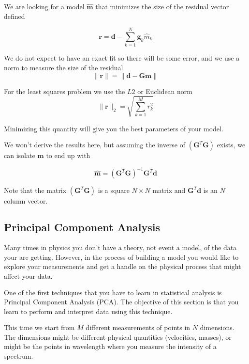 \documentclass{article}
\begin{document}
We are looking for a model $\hat{\mathbf{m}}$ that minimizes the size of the residual vector defined

\begin{equation}
\mathbf{r} = \mathbf{d} -  \sum_{k=1}^{N} \mathbf{g}_k \hat{m}_k
\end{equation}

We do not expect to have an exact fit so there will be some error, and we use a norm to measure the size of the residual
\begin{equation}
\| \mathbf{r} \| = \| \mathbf{d} - \mathbf{Gm} \|
\end{equation}

For the least squares problem we use the $L2$ or Euclidean norm 
\begin{equation}
\| \mathbf{r} \|_2 = \sqrt{\sum_{k=1}^M r^2_k}
\end{equation}

Minimizing this quantity will give you the best parameters of your model.


We won't derive the results here, but assuming the inverse of $(\mathbf{G}^T \mathbf{G})$ exists, we can isolate $\hat{\mathbf{m}}$ to end up with

\begin{equation}
\hat{\mathbf{m}} = {(\mathbf{G}^T \mathbf{G})}^{-1}\mathbf{G}^T \mathbf{d}   
\end{equation}

Note that the matrix ${(\mathbf{G}^T \mathbf{G})}$ is a square $N\times N$ matrix and $\mathbf{G}^T\mathbf{d}$ is an $N$ column vector. 

\subsection{Principal Component Analysis}

Many times in physics you don't have a theory, not event a model, of the data your are getting. However, in the process of building a model you would like to explore your measurements and get a handle on the physical process that might affect your data.

One of the first techniques that you have to learn in statistical analysis is Principal Component Analysis (PCA). The objective of this section is that you learn to perform and interpret data using this technique.

This time we start from $M$ different measurements of points in $N$ dimensions. The dimensions might be different physical quantities (velocities, masses), or might be the points in wavelength where you measure the intensity of a spectrum.
\end{document}
